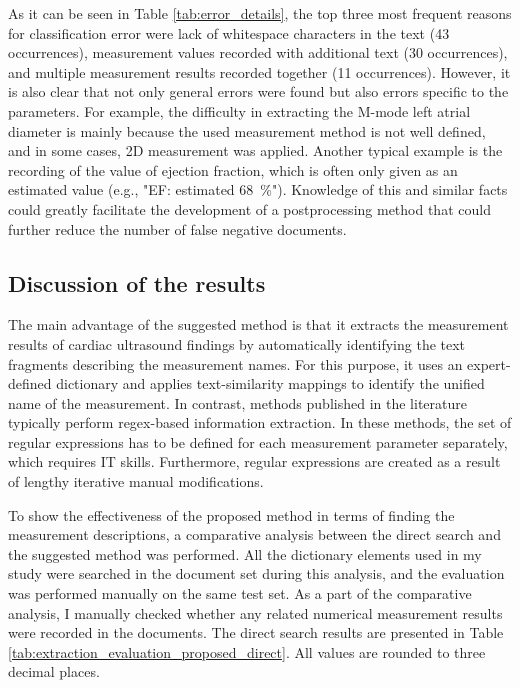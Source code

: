 As it can be seen in Table \ref{tab:error_details}, the top three most frequent reasons for classification error were lack of whitespace characters in the text (43 occurrences), measurement values recorded with additional text (30 occurrences), and multiple measurement results recorded together (11 occurrences). However, it is also clear that not only general errors were found but also errors specific to the parameters. For example, the difficulty in extracting the M-mode left atrial diameter is mainly because the used measurement method is not well defined, and in some cases, 2D measurement was applied. Another typical example is the recording of the value of ejection fraction, which is often only given as an estimated value (e.g., "EF: estimated \SI{68}{\percent}"). Knowledge of this and similar facts could greatly facilitate the development of a postprocessing method that could further reduce the number of false negative documents. 

\subsection{Discussion of the results}
\label{sec:patterson_comparison}

The main advantage of the suggested method is that it extracts the measurement results of cardiac ultrasound findings by automatically identifying the text fragments describing the measurement names. For this purpose, it uses an expert-defined dictionary and applies text-similarity mappings to identify the unified name of the measurement. In contrast, methods published in the literature typically perform regex-based information extraction. In these methods, the set of regular expressions has to be defined for each measurement parameter separately, which requires IT skills. Furthermore, regular expressions are created as a result of lengthy iterative manual modifications.

To show the effectiveness of the proposed method in terms of finding the measurement descriptions, a comparative analysis between the direct search and the suggested method was performed. All the dictionary elements used in my study were searched in the document set during this analysis, and the evaluation was performed manually on the same test set. As a part of the comparative analysis, I manually checked whether any related numerical measurement results were recorded in the documents. The direct search results are presented in Table \ref{tab:extraction_evaluation_proposed_direct}. All values are rounded to three decimal places.


